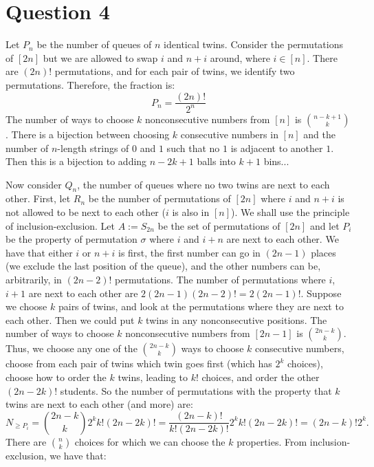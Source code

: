 \documentclass[]{article}
\begin{document}
\section{Question 4}
Let $P_n$ be the number of queues of $n$ identical twins. Consider the permutations of $[2n]$ but we are allowed to swap $i$ and $n + i$ around, where $i \in [n]$. There are $(2n)!$ permutations, and for each pair of twins, we identify two permutations. Therefore, the fraction is:
\begin{equation}
	P_n = \frac{(2n)!}{2^n}
\end{equation}
The number of ways to choose $k$ nonconsecutive numbers from $[n]$ is $\binom{n - k + 1}{k}$. There is a bijection between choosing $k$ consecutive numbers in $[n]$ and the number of $n$-length strings of $0$ and $1$ such that no $1$ is adjacent to another $1$. Then this is a bijection to adding $n - 2k + 1$ balls into $k + 1$ bins...
\par
Now consider $Q_n$, the number of queues where no two twins are next to each other. First, let $R_n$ be the number of permutations of $[2n]$ where $i$ and $n + i$ is not allowed to be next to each other ($i$ is also in $[n]$). We shall use the principle of inclusion-exclusion. Let $A := S_{2n}$ be the set of permutations of $[2n]$ and let $P_{i}$ be the property of permutation $\sigma$ where $i$ and $i + n$ are next to each other. We have that either $i$ or $n + i$ is first, the first number can go in $(2n - 1)$ places (we exclude the last position of the queue), and the other numbers can be, arbitrarily, in $(2n - 2)!$ permutations. The number of permutations where $i$, $i + 1$ are next to each other are $2(2n - 1) (2n - 2)! = 2 (2n - 1)!$. Suppose we choose $k$ pairs of twins, and look at the permutations where they are next to each other. Then we could put $k$ twins in any nonconsecutive positions. The number of ways to choose $k$ nonconsecutive numbers from $[2n-1]$ is $\binom{2n - k}{k}$. Thus, we choose any one of the $\binom{2n - k}{k}$ ways to choose $k$ consecutive numbers, choose from each pair of twins which twin goes first (which has $2^k$ choices), choose how to order the $k$ twins, leading to $k!$ choices, and order the other $(2n - 2k)!$ students. So the number of permutations with the property that $k$ twins are next to each other (and more) are:
\begin{equation}
	N_{\geq P_i} = \binom{2n - k}{k} 2^k k! (2n - 2k)! =  \frac{(2n - k)!}{k! (2n - 2k)!}2^k k! (2n - 2k)! = (2n - k)!2^k.
\end{equation}
There are $\binom{n}{k}$ choices for which we can choose the $k$ properties. From inclusion-exclusion, we have that:
\end{document}
